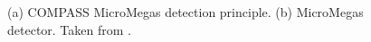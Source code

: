 \begin{figure}[!h]
  \centering
	\caption{(a) COMPASS MicroMegas detection principle. (b) MicroMegas detector. Taken from \cite{NIM}.}
	\label{pic:MM}
\end{figure}

